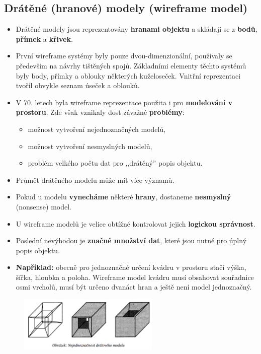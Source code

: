 \subsection{Drátěné (hranové) modely (wireframe model)}
\begin{itemize}
	\item Drátěné modely jsou reprezentovány \textbf{hranami objektu} a skládají se z \textbf{bodů}, \textbf{přímek} a \textbf{křivek}.
	\item První wireframe systémy byly pouze dvou-dimenzionální, používaly se především na návrhy tištěných spojů. Základními elementy těchto systémů byly body, přímky a oblouky některých kuželoseček. Vnitřní reprezentaci tvořil obvykle seznam úseček a oblouků.
	\item V 70. letech byla wireframe reprezentace použita i pro \textbf{modelování v prostoru}. Zde však vznikaly dost závažné \textbf{problémy}:
	\begin{itemize}
		\item možnost vytvoření nejednoznačných modelů,
		\item možnost vytvoření nesmyslných modelů,
		\item problém velkého počtu dat pro ,,drátěný'' popis objektu.
	\end{itemize}
	\item Průmět drátěného modelu může mít více významů.
	\item Pokud u modelu \textbf{vynecháme} některé \textbf{hrany}, dostaneme \textbf{nesmyslný} (nonsense) model.
	\item U wireframe modelů je velice obtížné kontrolovat jejich \textbf{logickou správnost}.
	\item Poslední nevýhodou je \textbf{značné množství dat}, které jsou nutné pro úplný popis objektu. 
	\item \textbf{Například:} obecně pro jednoznačné určení kvádru v prostoru stačí výška, šířka, hloubka a poloha. Wireframe model kvádru musí obsahovat souřadnice osmi vrcholů, musí být určeno dvanáct hran a ještě není model jednoznačný.
\end{itemize}

\begin{figure}[H]
	\centering
	\includegraphics[width=0.6\textwidth]{assets/4_dratovy_model}
\end{figure} 

